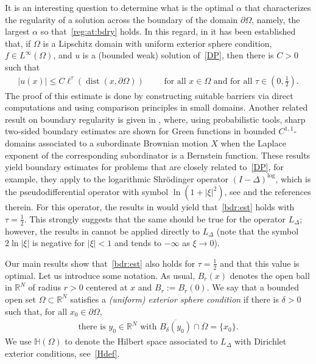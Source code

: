 \documentclass[11pt]{article}
\newcommand{\R}{\mathbb{R}}
\numberwithin{equation}{section}
\begin{document}
It is an interesting question to determine what is the optimal $\alpha$ that characterizes the regularity of a solution across the boundary of the domain $\partial \Omega$, namely, the largest $\alpha$ so that~\eqref{reg:at:bdry} holds.  In this regard, in \cite[Theorem 1.11]{CW19} it has been established that, if $\Omega$ is a Lipschitz domain with uniform exterior sphere condition, $f\in L^\infty(\Omega)$, and $u$ is a (bounded weak) solution of~\eqref{DP}, then there is $C>0$ such that
\begin{align}\label{bdr:est}
    |u(x)|\leq C\ell^{\tau}(\operatorname{dist}(x,\partial \Omega))\qquad \text{ for all }x\in \Omega \text{ and for all }\tau\in(0,\tfrac{1}{2}).
\end{align}
The proof of this estimate is done by constructing suitable barriers via direct computations and using comparison principles in small domains. Another related result on boundary regularity is given in \cite{kim2014green}, where, using probabilistic tools, sharp two-sided boundary estimates are shown for Green functions in bounded $C^{1,1}$-domains associated to a subordinate Brownian motion $X$ when the Laplace exponent of the corresponding subordinator is a Bernstein function. These results yield boundary estimates for problems that are closely related to~\eqref{DP}, for example, they apply to the logarithmic Shrödinger operator $(I-\Delta)^{\log}$, which is the pseudodifferential operator with symbol $\ln(1+|\xi|^2)$, see \cite{feulefack2023logarithmic,feulefack2023fractional} and the references therein.  For this operator, the results in \cite{kim2014green} would yield that~\eqref{bdr:est} holds with $\tau=\frac{1}{2}$.  This strongly suggests that the same should be true for the operator $L_\Delta$; however, the results in \cite{kim2014green} cannot be applied directly to $L_\Delta$ (note that the symbol $2\ln|\xi|$ is negative for $|\xi|<1$ and tends to $-\infty$ as $\xi\to 0$).

Our main results show that~\eqref{bdr:est} also holds for $\tau=\frac{1}{2}$ and that this value is optimal.  Let us introduce some notation.  As usual, $B_r(x)$ denotes the open ball in $\R^N$ of radius $r>0$ centered at $x$ and $B_r:=B_r(0)$.  We say that a bounded open set $\Omega\subset \R^N$ satisfies a \emph{(uniform) exterior sphere condition} if there is $\delta>0$ such that, for all $x_0 \in \partial \Omega$,
\begin{align}\label{eta:def}
\text{there is $y_0\in \R^N$ with $\overline{B_{\delta}(y_0)} \cap \overline{\Omega} = \{ x_0 \}$.}
\end{align}
  We use $\mathbb H(\Omega)$ to denote the Hilbert space associated to $L_\Delta$ with Dirichlet exterior conditions, see~\eqref{Hdef}. 
  
\end{document}

